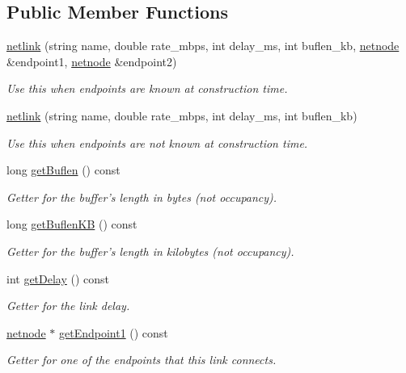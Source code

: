 \subsection*{Public Member Functions}
\begin{DoxyCompactItemize}
\item 
\hyperlink{classnetlink_a80fb314878612a849029c50ffaca2493}{netlink} (string name, double rate\-\_\-mbps, int delay\-\_\-ms, int buflen\-\_\-kb, \hyperlink{classnetnode}{netnode} \&endpoint1, \hyperlink{classnetnode}{netnode} \&endpoint2)
\begin{DoxyCompactList}\small\item\em Use this when endpoints are known at construction time. \end{DoxyCompactList}\item 
\hyperlink{classnetlink_ad82c705751d6eba3e0aee7cc51bc79ac}{netlink} (string name, double rate\-\_\-mbps, int delay\-\_\-ms, int buflen\-\_\-kb)
\begin{DoxyCompactList}\small\item\em Use this when endpoints are not known at construction time. \end{DoxyCompactList}\item 
long \hyperlink{classnetlink_abc9b2aa6e7f70d7c7c6d3db10ce4411e}{get\-Buflen} () const 
\begin{DoxyCompactList}\small\item\em Getter for the buffer's length in bytes (not occupancy). \end{DoxyCompactList}\item 
long \hyperlink{classnetlink_a620d116c9c81ba9acd3d6bddf26823e2}{get\-Buflen\-K\-B} () const 
\begin{DoxyCompactList}\small\item\em Getter for the buffer's length in kilobytes (not occupancy). \end{DoxyCompactList}\item 
int \hyperlink{classnetlink_acb7cdd8817ce85ce1c4a6641871f0768}{get\-Delay} () const 
\begin{DoxyCompactList}\small\item\em Getter for the link delay. \end{DoxyCompactList}\item 
\hyperlink{classnetnode}{netnode} $\ast$ \hyperlink{classnetlink_a3d479ae6579650a2137265132994c230}{get\-Endpoint1} () const 
\begin{DoxyCompactList}\small\item\em Getter for one of the endpoints that this link connects. \end{DoxyCompactList}\item 

\end{DoxyCompactItemize}
